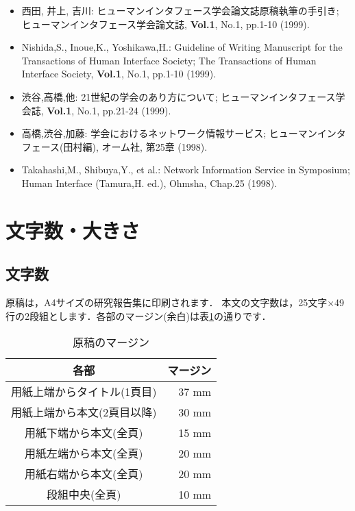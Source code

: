 \documentclass{hisken}
\begin{document}
	{\small
	\begin{itemize}
	\item[{[1]}]
		西田, 井上, 吉川:
		ヒューマンインタフェース学会論文誌原稿執筆の手引き;
		ヒューマンインタフェース学会論文誌,
		{\bf Vol.1}, No.1, pp.1-10 (1999).
	\item[{[2]}]
		Nishida,S., Inoue,K., Yoshikawa,H.:
		Guideline of Writing Manuscript for the Transactions of Human Interface Society;
		The Transactions of Human Interface Society,
		{\bf Vol.1}, No.1, pp.1-10 (1999).
	\item[{[3]}]
		渋谷,高橋,他:
		21世紀の学会のあり方について;
		ヒューマンインタフェース学会誌,
		{\bf Vol.1}, No.1, pp.21-24 (1999).
	\item[{[4]}]
		高橋,渋谷,加藤:
		学会におけるネットワーク情報サービス;
		ヒューマンインタフェース(田村編),
		オーム社, 第25章 (1998).
	\item[{[5]}]
		Takahashi,M., Shibuya,Y., et al.:
		Network Information Service in Symposium;
		Human Interface (Tamura,H. ed.),
		Ohmsha, Chap.25 (1998).
	\end{itemize}}


\section{文字数・大きさ}

\subsection{文字数}
原稿は，A4サイズの研究報告集に印刷されます．
本文の文字数は，25文字×49行の2段組とします．各部のマージン(余白)は表\ref{table:margin}の通りです．

\begin{table}[bt]
	\begin{center}
	\caption{原稿のマージン}		%
	\label{table:margin}
	\begin{tabular}[hbt]{c r}
	\hline
	\bf 各部 & \bf マージン\\
        \hline
        用紙上端からタイトル(1頁目) & 37 mm\\
        用紙上端から本文(2頁目以降) & 30 mm\\
        用紙下端から本文(全頁) & 15 mm\\
        用紙左端から本文(全頁) & 20 mm\\
        用紙右端から本文(全頁) & 20 mm\\
        段組中央(全頁) & 10 mm\\
        \hline
	\end{tabular}
	\end{center}
\end{table}
\end{document}
